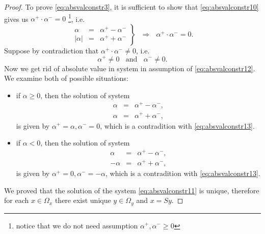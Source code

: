 \begin{proof}
\noindent To prove \eqref{eq:absvalconstr3}, it is sufficient to show that \eqref{eq:absvalconstr10} gives us $\alpha^{+} \cdot \alpha^{-} = 0$
\footnote{notice that we do not need assumption $\alpha^{+},\alpha^{-} \geq 0$}, 
i.e.
\begin{equation}
 \label{eq:absvalconstr12}
 \left.
 \begin{array}{rcl}
  \alpha & = & \alpha^{+} - \alpha^{-} \\
  \vert \alpha \vert & = & \alpha^{+} + \alpha^{-}
 \end{array}
 \right\rbrace ~~~ \Rightarrow
 ~~~ \alpha^{+} \cdot \alpha^{-} = 0.
\end{equation}
Suppose by contradiction that $\alpha^{+} \cdot \alpha^{-} \neq 0$, i.e.
\begin{equation}
 \label{eq:absvalconstr13}
 \alpha^{+} \neq 0 ~~~~ \textrm{and} ~~~~ \alpha^{-} \neq 0.
\end{equation}
Now we get rid of absolute value in system in assumption of \eqref{eq:absvalconstr12}.
We examine both of possible situations:
\begin{itemize}
 \item if $\alpha \geq 0$, then the solution of system
  \begin{displaymath}
   \begin{array}{rcl}
    \alpha & = & \alpha^{+} - \alpha^{-}, \\
    \alpha& = & \alpha^{+} + \alpha^{-}, 
   \end{array}
  \end{displaymath}
  is given by $\alpha^{+} = \alpha, \alpha^{-} = 0$, which is a contradition with \eqref{eq:absvalconstr13}.
 \item if $\alpha < 0$, then the solution of system
  \begin{displaymath}
   \begin{array}{rcl}
    \alpha & = & \alpha^{+} - \alpha^{-}, \\
    -\alpha& = & \alpha^{+} + \alpha^{-}, 
   \end{array}
  \end{displaymath}
  is given by $\alpha^{+} = 0, \alpha^{-} = -\alpha$, which is a contradition with \eqref{eq:absvalconstr13}.
\end{itemize}

We proved that the solution of the system \eqref{eq:absvalconstr11} is unique, therefore for each $x \in \Omega_x$ there exist unique $y \in \Omega_y$ and $x = Sy$.

\end{proof}
